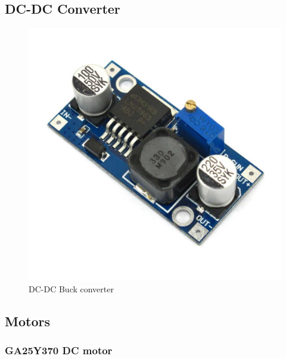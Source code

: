 \subsection{DC-DC Converter}

	\begin{figure}[H]
			\centering
			\includegraphics[scale=0.24]{images/ProjectComponents/buck.jpg}
			\caption{DC-DC Buck converter }
			\label{}
	\end{figure}
	\bigskip


\subsection{Motors}

	\subsubsection{GA25Y370 DC motor}
	
